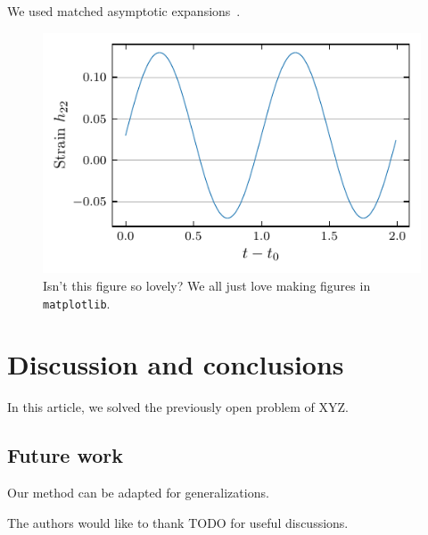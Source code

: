 \documentclass[aps,prd,twocolumn,superscriptaddress,preprintnumbers,floatfix,nofootinbib]{revtex4-2}
\begin{document}
We used matched asymptotic expansions~\cite{bender1999advanced}.
%
\begin{figure}[t]
  \begin{center}
    \includegraphics[width=\columnwidth]{specified_size}
  \end{center}
  \vspace{-\baselineskip}
  \caption{%
    Isn't this figure so lovely? We all just love making figures in
    \texttt{matplotlib}.}
  \label{fig:lovely}
  \vspace{-\baselineskip}
\end{figure}
%
\lipsum[2-4]

\section{Discussion and conclusions}
\label{sec:disc-concl}

In this article, we solved the previously open problem of XYZ.
\lipsum[5]

\subsection{Future work}
\label{sec:future-work}

Our method can be adapted for generalizations.

\acknowledgments
%
The authors would like to thank
%
TODO
%
for useful discussions.




\end{document}
